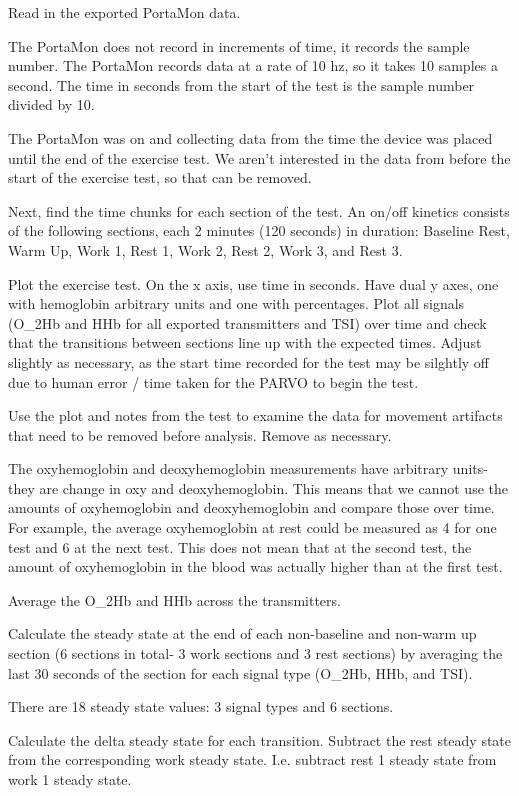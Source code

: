 \documentclass[
]{book}
\begin{document}
Read in the exported PortaMon data.

The PortaMon does not record in increments of time, it records the sample number. The PortaMon records data at a rate of 10 hz, so it takes 10 samples a second. The time in seconds from the start of the test is the sample number divided by 10.

The PortaMon was on and collecting data from the time the device was placed until the end of the exercise test. We aren't interested in the data from before the start of the exercise test, so that can be removed.

Next, find the time chunks for each section of the test. An on/off kinetics consists of the following sections, each 2 minutes (120 seconds) in duration: Baseline Rest, Warm Up, Work 1, Rest 1, Work 2, Rest 2, Work 3, and Rest 3.

Plot the exercise test. On the x axis, use time in seconds. Have dual y axes, one with hemoglobin arbitrary units and one with percentages. Plot all signals (O\_2Hb and HHb for all exported transmitters and TSI) over time and check that the transitions between sections line up with the expected times. Adjust slightly as necessary, as the start time recorded for the test may be silghtly off due to human error / time taken for the PARVO to begin the test.

Use the plot and notes from the test to examine the data for movement artifacts that need to be removed before analysis. Remove as necessary.

The oxyhemoglobin and deoxyhemoglobin measurements have arbitrary units- they are change in oxy and deoxyhemoglobin. This means that we cannot use the amounts of oxyhemoglobin and deoxyhemoglobin and compare those over time. For example, the average oxyhemoglobin at rest could be measured as 4 for one test and 6 at the next test. This does not mean that at the second test, the amount of oxyhemoglobin in the blood was actually higher than at the first test.

Average the O\_2Hb and HHb across the transmitters.

Calculate the steady state at the end of each non-baseline and non-warm up section (6 sections in total- 3 work sections and 3 rest sections) by averaging the last 30 seconds of the section for each signal type (O\_2Hb, HHb, and TSI).

There are 18 steady state values: 3 signal types and 6 sections.

Calculate the delta steady state for each transition.
Subtract the rest steady state from the corresponding work steady state. I.e. subtract rest 1 steady state from work 1 steady state.
\end{document}
